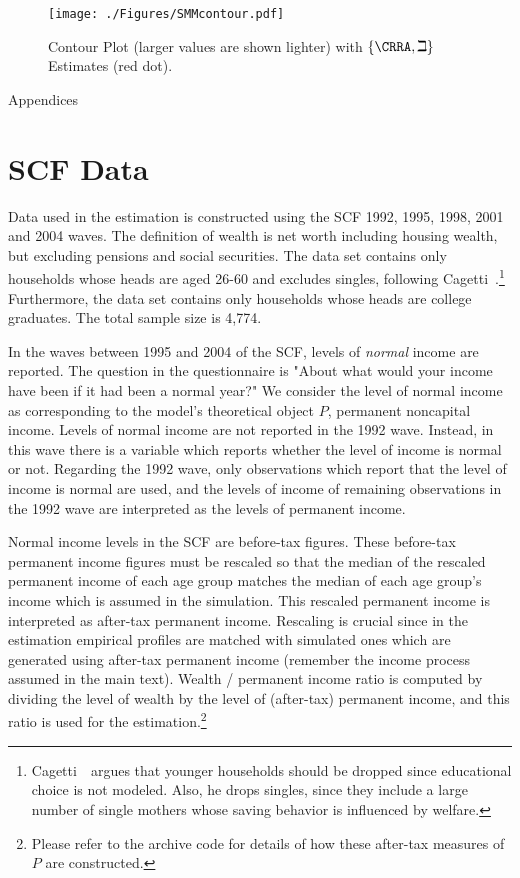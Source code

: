 \documentclass[titlepage, headings=optiontotocandhead]{Resources/texmf-local/tex/latex/econtex}
\begin{document}
\hypertarget{PlotContourMedianStrEst}{}
\begin{figure}
  \texttt{[image: ./Figures/SMMcontour.pdf]}
  \caption{Contour Plot (larger values are shown lighter) with $\{\CRRA,{\beth}\}$ Estimates (red dot).}
  \label{fig:PlotContourMedianStrEst}
\end{figure}



\clearpage\vfill\eject

\centerline{\LARGE Appendices}\vspace{0.2in}

\appendix


\hypertarget{scf-data}{}
\section{SCF Data}\label{app:scf-data}

Data used in the estimation is constructed using the SCF 1992, 1995, 1998, 2001 and 2004 waves. The definition of wealth is net worth including housing wealth, but excluding pensions and social securities. The data set contains only households whose heads are aged 26-60 and excludes singles, following Cagetti~\citeyearpar{cagettiWprofiles}.\footnote{Cagetti~\citeyearpar{cagettiWprofiles}\ argues that younger households should be dropped since educational choice is not modeled. Also, he drops singles, since they include a large number of single mothers whose saving behavior is influenced by welfare.} Furthermore, the data set contains only households whose heads are college graduates. The total sample size is 4,774.

In the waves between 1995 and 2004 of the SCF, levels of \textit{normal} income are reported. The question in the questionnaire is "About what would your income have been if it had been a normal year?" We consider the level of normal income as corresponding to the model's theoretical object $P$, permanent noncapital income. Levels of normal income are not reported in the 1992 wave. Instead, in this wave there is a variable which reports whether the level of income is normal or not. Regarding the 1992 wave, only observations which report that the level of income is normal are used, and the levels of income of remaining observations in the 1992 wave are interpreted as the levels of permanent income.

Normal income levels in the SCF are before-tax figures. These before-tax permanent income figures must be rescaled so that the median of the rescaled permanent income of each age group matches the median of each age group's income which is assumed in the simulation. This rescaled permanent income is interpreted as after-tax permanent income. Rescaling is crucial since in the estimation empirical profiles are matched with simulated ones which are generated using after-tax permanent income (remember the income process assumed in the main text). Wealth / permanent income ratio is computed by dividing the level of wealth by the level of (after-tax) permanent income, and this ratio is used for the estimation.\footnote{Please refer to the archive code for details of how these after-tax measures of $P$ are constructed.}
\end{document}
